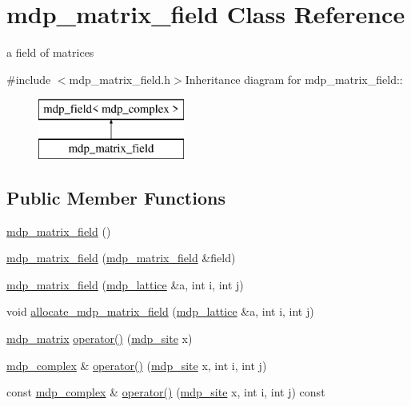 \hypertarget{classmdp__matrix__field}{
\section{mdp\_\-matrix\_\-field Class Reference}
\label{classmdp__matrix__field}
}


a field of matrices  


{\ttfamily \#include $<$mdp\_\-matrix\_\-field.h$>$}Inheritance diagram for mdp\_\-matrix\_\-field::\begin{figure}[H]
\begin{center}
\leavevmode
\includegraphics[height=2cm]{classmdp__matrix__field}
\end{center}
\end{figure}
\subsection*{Public Member Functions}
\begin{DoxyCompactItemize}
\item 
\hyperlink{classmdp__matrix__field_adebb4692eba7a0f92450e227a1b28ca3}{mdp\_\-matrix\_\-field} ()
\item 
\hyperlink{classmdp__matrix__field_aadbe032bb53bdd590d21a19ec43ad2cd}{mdp\_\-matrix\_\-field} (\hyperlink{classmdp__matrix__field}{mdp\_\-matrix\_\-field} \&field)
\item 
\hyperlink{classmdp__matrix__field_a970b03a7754e8c1e402afc9596502098}{mdp\_\-matrix\_\-field} (\hyperlink{classmdp__lattice}{mdp\_\-lattice} \&a, int i, int j)
\item 
void \hyperlink{classmdp__matrix__field_a468a38e8bc504fc7f21bdb333ca8630b}{allocate\_\-mdp\_\-matrix\_\-field} (\hyperlink{classmdp__lattice}{mdp\_\-lattice} \&a, int i, int j)
\item 
\hyperlink{classmdp__matrix}{mdp\_\-matrix} \hyperlink{classmdp__matrix__field_ade5f9563b36bcdd98e5341a4a29059fc}{operator()} (\hyperlink{classmdp__site}{mdp\_\-site} x)
\item 
\hyperlink{classmdp__complex}{mdp\_\-complex} \& \hyperlink{classmdp__matrix__field_afdd2e11b6ab1b36f0bd6e354dbdefe42}{operator()} (\hyperlink{classmdp__site}{mdp\_\-site} x, int i, int j)
\item 
const \hyperlink{classmdp__complex}{mdp\_\-complex} \& \hyperlink{classmdp__matrix__field_a2a9dd3e66caef6fea9415aa8917e3ce9}{operator()} (\hyperlink{classmdp__site}{mdp\_\-site} x, int i, int j) const 
\end{DoxyCompactItemize}
